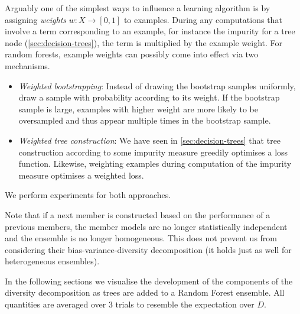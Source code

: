 \documentclass[../main.tex]{subfiles}
\begin{document}
Arguably one of the simplest ways to influence a learning algorithm is by assigning \textit{weights} $w: X \to [0,1]$ to examples. During any computations that involve a term corresponding to an example, for instance the impurity for a tree node (\cf \ref{sec:decision-trees}), the term is multiplied by the example weight. 
For random forests, example weights can possibly come into effect via two mechanisms. 
\begin{itemize}
    \item \textit{Weighted bootstrapping}: Instead of drawing the bootstrap samples uniformly, draw a sample with probability according to its weight. If the bootstrap sample is large, examples with higher weight are more likely to be oversampled and thus appear multiple times in the bootstrap sample. 
    \item \textit{Weighted tree construction}: We have seen in \cref{sec:decision-trees} that tree construction according to some impurity measure greedily optimises a loss function. Likewise, weighting examples during computation of the impurity measure optimises a weighted loss.
\end{itemize}
We perform experiments for both approaches.

Note that if a next member is constructed based on the performance of a previous members, the member models are no longer statistically independent and the ensemble is no longer homogeneous. This does not prevent us from considering their bias-variance-diversity decomposition (it holds just as well for heterogeneous ensembles).

In the following sections we visualise the development of the components of the diversity decomposition as trees are added to a Random Forest ensemble. All quantities are averaged over $3$ trials to resemble the expectation over $D$.

\end{document}
